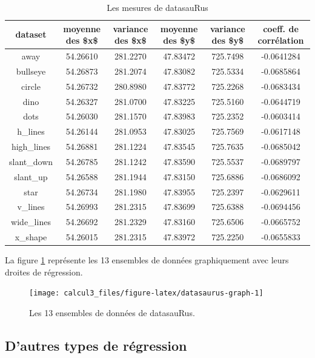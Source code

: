 \documentclass[]{book}
\theoremstyle{definition}
\theoremstyle{definition}
\theoremstyle{definition}
\theoremstyle{remark}
\begin{document}
\begin{table}[t]

\caption{\label{tab:datasaurus-mesures}Les mesures de datasauRus}
\centering
\begin{tabular}{cccccc}
\toprule
dataset & moyenne des \$x\$ & variance des \$x\$ & moyenne des \$y\$ & variance des \$y\$ & coeff. de corrélation\\
\midrule
away & 54.26610 & 281.2270 & 47.83472 & 725.7498 & -0.0641284\\
bullseye & 54.26873 & 281.2074 & 47.83082 & 725.5334 & -0.0685864\\
circle & 54.26732 & 280.8980 & 47.83772 & 725.2268 & -0.0683434\\
dino & 54.26327 & 281.0700 & 47.83225 & 725.5160 & -0.0644719\\
dots & 54.26030 & 281.1570 & 47.83983 & 725.2352 & -0.0603414\\
\addlinespace
h\_lines & 54.26144 & 281.0953 & 47.83025 & 725.7569 & -0.0617148\\
high\_lines & 54.26881 & 281.1224 & 47.83545 & 725.7635 & -0.0685042\\
slant\_down & 54.26785 & 281.1242 & 47.83590 & 725.5537 & -0.0689797\\
slant\_up & 54.26588 & 281.1944 & 47.83150 & 725.6886 & -0.0686092\\
star & 54.26734 & 281.1980 & 47.83955 & 725.2397 & -0.0629611\\
\addlinespace
v\_lines & 54.26993 & 281.2315 & 47.83699 & 725.6388 & -0.0694456\\
wide\_lines & 54.26692 & 281.2329 & 47.83160 & 725.6506 & -0.0665752\\
x\_shape & 54.26015 & 281.2315 & 47.83972 & 725.2250 & -0.0655833\\
\bottomrule
\end{tabular}
\end{table}

La figure \ref{fig:datasaurus-graph} représente les 13 ensembles de
données graphiquement avec leurs droites de régression.

\begin{figure}

{\centering \texttt{[image: calcul3\_files/figure-latex/datasaurus-graph-1]} 

}

\caption{Les 13 ensembles de données de datasauRus.}\label{fig:datasaurus-graph}
\end{figure}

\hypertarget{dautres-types-de-regression}{%
\subsection{D'autres types de
régression}\label{dautres-types-de-regression}}
\end{document}
